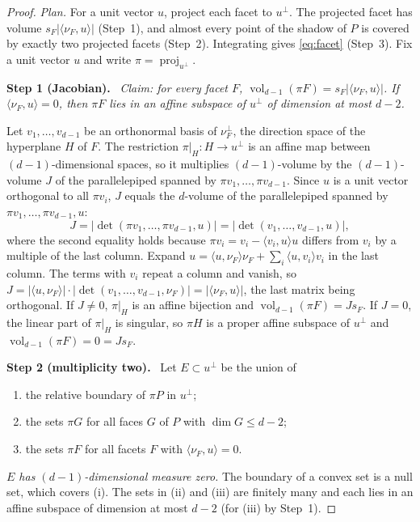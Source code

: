 \documentclass[11pt]{article}
\DeclareMathOperator{\vol}{vol}
\DeclareMathOperator{\proj}{proj}
\newcommand{\step}[1]{\par\smallskip\noindent\textbf{#1}\ }
\begin{document}
\begin{proof}
\emph{Plan.} For a unit vector \(u\), project each facet to \(u^\perp\).
The projected facet has volume \(s_F|\langle\nu_F,u\rangle|\) (Step~1),
and almost every point of the shadow of \(P\) is covered by exactly two
projected facets (Step~2). Integrating gives \eqref{eq:facet} (Step~3).
Fix a unit vector \(u\) and write \(\pi=\proj_{u^\perp}\).

\step{Step 1 (Jacobian).} \emph{Claim: for every facet \(F\),
\(\vol_{d-1}(\pi F)=s_F|\langle\nu_F,u\rangle|\). If
\(\langle\nu_F,u\rangle=0\), then \(\pi F\) lies in an affine subspace
of \(u^\perp\) of dimension at most \(d-2\).}

Let \(v_1,\ldots,v_{d-1}\) be an orthonormal basis of \(\nu_F^\perp\),
the direction space of the hyperplane \(H\) of \(F\). The restriction
\(\pi|_H\colon H\to u^\perp\) is an affine map between
\((d-1)\)-dimensional spaces, so it multiplies \((d-1)\)-volume by the
\((d-1)\)-volume \(J\) of the parallelepiped spanned by
\(\pi v_1,\ldots,\pi v_{d-1}\). Since \(u\) is a unit vector orthogonal
to all \(\pi v_i\), \(J\) equals the \(d\)-volume of the parallelepiped
spanned by \(\pi v_1,\ldots,\pi v_{d-1},u\):
\[
 J=|\det(\pi v_1,\ldots,\pi v_{d-1},u)|
  =|\det(v_1,\ldots,v_{d-1},u)|,
\]
where the second equality holds because
\(\pi v_i=v_i-\langle v_i,u\rangle u\) differs from \(v_i\) by a
multiple of the last column. Expand
\(u=\langle u,\nu_F\rangle\nu_F+\sum_i\langle u,v_i\rangle v_i\) in the
last column. The terms with \(v_i\) repeat a column and vanish, so
\(J=|\langle u,\nu_F\rangle|\cdot|\det(v_1,\ldots,v_{d-1},\nu_F)|
=|\langle\nu_F,u\rangle|\), the last matrix being orthogonal. If
\(J\ne0\), \(\pi|_H\) is an affine bijection and
\(\vol_{d-1}(\pi F)=Js_F\). If \(J=0\), the linear part of \(\pi|_H\)
is singular, so \(\pi H\) is a proper affine subspace of \(u^\perp\)
and \(\vol_{d-1}(\pi F)=0=Js_F\).

\step{Step 2 (multiplicity two).} Let \(E\subset u^\perp\) be the union
of
\begin{enumerate}[label=(\roman*),leftmargin=3em,nosep]
\item the relative boundary of \(\pi P\) in \(u^\perp\);
\item the sets \(\pi G\) for all faces \(G\) of \(P\) with
 \(\dim G\le d-2\);
\item the sets \(\pi F\) for all facets \(F\) with
 \(\langle\nu_F,u\rangle=0\).
\end{enumerate}
\emph{\(E\) has \((d-1)\)-dimensional measure zero.} The boundary of a
convex set is a null set, which covers (i). The sets in (ii) and (iii)
are finitely many and each lies in an affine subspace of dimension at
most \(d-2\) (for (iii) by Step~1).


\end{proof}
\end{document}
